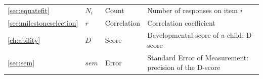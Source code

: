 \documentclass[
]{book}
\begin{document}
\begin{longtable}[]{@{}llll@{}}
\begin{minipage}[t]{0.10\columnwidth}
\ref{sec:equatefit}\strut
\end{minipage} & \begin{minipage}[t]{0.13\columnwidth}\raggedright
\(N_i\)\strut
\end{minipage} & \begin{minipage}[t]{0.13\columnwidth}\raggedright
Count\strut
\end{minipage} & \begin{minipage}[t]{0.53\columnwidth}\raggedright
Number of responses on item \(i\)\strut
\end{minipage}\tabularnewline
\begin{minipage}[t]{0.10\columnwidth}\raggedright
\ref{sec:milestoneselection}\strut
\end{minipage} & \begin{minipage}[t]{0.13\columnwidth}\raggedright
\(r\)\strut
\end{minipage} & \begin{minipage}[t]{0.13\columnwidth}\raggedright
Correlation\strut
\end{minipage} & \begin{minipage}[t]{0.53\columnwidth}\raggedright
Correlation coefficient\strut
\end{minipage}\tabularnewline
\begin{minipage}[t]{0.10\columnwidth}\raggedright
\ref{ch:ability}\strut
\end{minipage} & \begin{minipage}[t]{0.13\columnwidth}\raggedright
\(D\)\strut
\end{minipage} & \begin{minipage}[t]{0.13\columnwidth}\raggedright
Score\strut
\end{minipage} & \begin{minipage}[t]{0.53\columnwidth}\raggedright
Developmental score of a child: D-score\strut
\end{minipage}\tabularnewline
\begin{minipage}[t]{0.10\columnwidth}\raggedright
\ref{sec:sem}\strut
\end{minipage} & \begin{minipage}[t]{0.13\columnwidth}\raggedright
\(sem\)\strut
\end{minipage} & \begin{minipage}[t]{0.13\columnwidth}\raggedright
Error\strut
\end{minipage} & \begin{minipage}[t]{0.53\columnwidth}\raggedright
Standard Error of Measurement: precision of the D-score\strut
\end{minipage}\tabularnewline
\bottomrule
\end{longtable}
\end{document}
